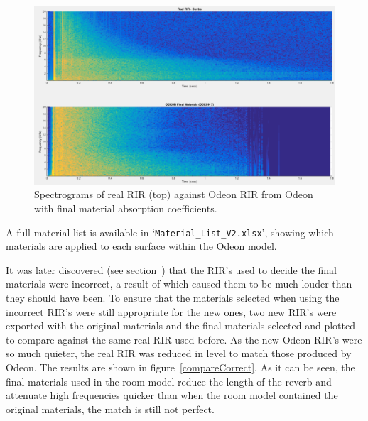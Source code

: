 \documentclass[../../main.tex]{subfiles}
\begin{document}
			\begin{figure}[H]
				\center\includegraphics[scale = 0.3]{Sections/Implementation/Odeon/images/MaterialCompare/OriginalMaterials/new.png}
				\caption{Spectrograms of real \ac{RIR} (top) against Odeon \ac{RIR} from Odeon with final material absorption coefficients.}
				\label{compareNew}
			\end{figure}

			A full material list is available in `\texttt{Material\_List\_V2.xlsx}', showing which materials are applied to each surface within the Odeon model.

			It was later discovered (see section~) that the \ac{RIR}'s used to decide the final materials were incorrect, a result of which caused them to be much louder than they should have been. To ensure that the materials selected when using the incorrect \ac{RIR}'s were still appropriate for the new ones, two new \ac{RIR}'s were exported with the original materials and the final materials selected and plotted to compare against the same real \ac{RIR} used before. As the new Odeon \ac{RIR}'s were so much quieter, the real \ac{RIR} was reduced in level to match those produced by Odeon. The results are shown in figure~\ref{compareCorrect}. As it can be seen, the final materials used in the room model reduce the length of the reverb and attenuate high frequencies quicker than when the room model contained the original materials, the match is still not perfect.  
\end{document}
